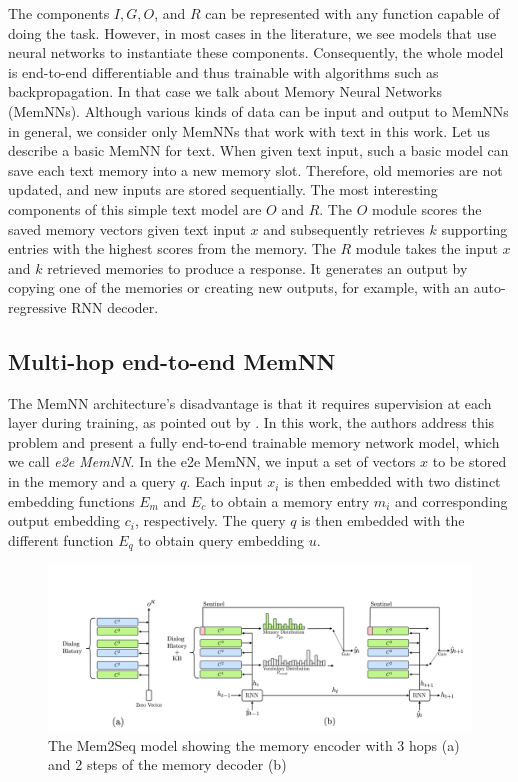 The components $I, G, O$, and $R$ can be represented with any function capable of doing the task.
However, in most cases in the literature, we see models that use neural networks to instantiate these components.
Consequently, the whole model is end-to-end differentiable and thus trainable with algorithms such as backpropagation.
In that case we talk about Memory Neural Networks (MemNNs).
Although various kinds of data can be input and output to MemNNs in general, we consider only MemNNs that work with text in this work.
Let us describe a basic MemNN for text.
When given text input, such a basic model can save each text memory into a new memory slot.
Therefore, old memories are not updated, and new inputs are stored sequentially.
The most interesting components of this simple text model are $O$ and $R$.
The $O$ module scores the saved memory vectors given text input $x$ and subsequently retrieves $k$ supporting entries with the highest scores from the memory.
The $R$ module takes the input $x$ and $k$ retrieved memories to produce a response.
It generates an output by copying one of the memories or creating new outputs, for example, with an auto-regressive RNN decoder. 

\subsection{Multi-hop end-to-end MemNN}
The MemNN architecture's disadvantage is that it requires supervision at each layer during training, as pointed out by \citet{sukhbaatar2015end}.
In this work, the authors address this problem and present a fully end-to-end trainable memory network model, which we call \emph{e2e MemNN}.
In the e2e MemNN, we input a set of vectors $x$ to be stored in the memory and a query $q$.
Each input $x_i$ is then embedded with two distinct embedding functions $E_m$ and $E_c$ to obtain a memory entry $m_i$ and corresponding output embedding $c_i$, respectively.
The query $q$ is then embedded with the different function $E_q$ to obtain query embedding $u$.

\begin{figure}[t]
    \centering
    \includegraphics[width=\textwidth]{images/mem2seq.png}
    \caption{The Mem2Seq model \cite{madotto-etal-2018-mem2seq} showing the memory encoder with 3 hops (a) and 2 steps of the memory decoder (b) }
    \label{fig:mem2seq}
\end{figure}

